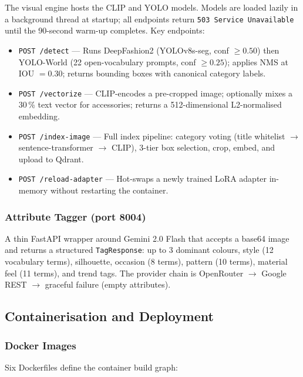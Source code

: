 \documentclass[12pt]{article}
\begin{document}
The visual engine hosts the CLIP and YOLO models. Models are loaded lazily in a background thread at startup; all endpoints return \texttt{503 Service Unavailable} until the 90-second warm-up completes. Key endpoints:

\begin{itemize}[leftmargin=*]
  \item \texttt{POST /detect} --- Runs DeepFashion2 (YOLOv8s-seg, conf $\ge 0.50$) then YOLO-World (22 open-vocabulary prompts, conf $\ge 0.25$); applies NMS at IOU $= 0.30$; returns bounding boxes with canonical category labels.
  \item \texttt{POST /vectorize} --- CLIP-encodes a pre-cropped image; optionally mixes a 30\,\% text vector for accessories; returns a 512-dimensional L2-normalised embedding.
  \item \texttt{POST /index-image} --- Full index pipeline: category voting (title whitelist $\to$ sentence-transformer $\to$ CLIP), 3-tier box selection, crop, embed, and upload to Qdrant.
  \item \texttt{POST /reload-adapter} --- Hot-swaps a newly trained LoRA adapter in-memory without restarting the container.
\end{itemize}

\subsubsection{Attribute Tagger (port 8004)}

A thin FastAPI wrapper around Gemini 2.0 Flash that accepts a base64 image and returns a structured \texttt{TagResponse}: up to 3 dominant colours, style (12 vocabulary terms), silhouette, occasion (8 terms), pattern (10 terms), material feel (11 terms), and trend tags. The provider chain is OpenRouter $\to$ Google REST $\to$ graceful failure (empty attributes).

\subsection{Containerisation and Deployment}

\subsubsection{Docker Images}

Six Dockerfiles define the container build graph:
\end{document}

